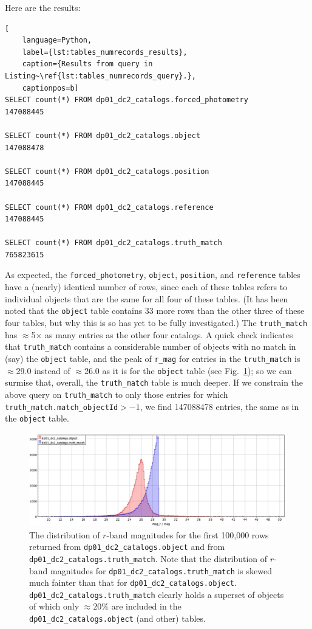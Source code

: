 \documentclass[DM,authoryear,toc]{lsstdoc}
\begin{document}
Here are the results:

\begin{lstlisting}[
    language=Python,
    label={lst:tables_numrecords_results},
    caption={Results from query in Listing~\ref{lst:tables_numrecords_query}.},
    captionpos=b]
SELECT count(*) FROM dp01_dc2_catalogs.forced_photometry
147088445

SELECT count(*) FROM dp01_dc2_catalogs.object
147088478

SELECT count(*) FROM dp01_dc2_catalogs.position
147088445
 
SELECT count(*) FROM dp01_dc2_catalogs.reference
147088445

SELECT count(*) FROM dp01_dc2_catalogs.truth_match
765823615
\end{lstlisting}

As expected, the \texttt{forced\_photometry}, \texttt{object},
\texttt{position}, and \texttt{reference} tables have a (nearly)
identical number of rows, since each of these tables refers to
individual objects that are the same for all four of these tables.
(It has been noted that the \texttt{object} table contains 33 more
rows than the other three of these four tables, but why this is so has
yet to be fully investigated.)  The \texttt{truth\_match} has
$\approx$5$\times$ as many entries as the other four catalogs.  A
quick check indicates that \texttt{truth\_match} contains a
considerable number of objects with no match in (say) the
\texttt{object} table, and the peak of \texttt{r\_mag} for entries in
the \texttt{truth\_match} is $\approx$29.0 instead of $\approx$26.0 as it is
for the \texttt{object} table (see
Fig.~\ref{fig:truth_match_object_mag_r}); so we can surmise that, overall,
the \texttt{truth\_match} table is much deeper.  If we constrain the above
query on \texttt{truth\_match} to only those entries for which
\texttt{truth\_match.match\_objectId}$>-1$, we find 147088478 entries,
the same as in the \texttt{object} table.

\begin{figure}
\includegraphics[width=1.0\textwidth]{Plots/truth_match_object_mag_r.pdf}
\caption{The distribution of $r$-band magnitudes for the first 100,000 rows returned from \texttt{dp01\_dc2\_catalogs.object} and from \texttt{dp01\_dc2\_catalogs.truth\_match}.  Note that the distribution of $r$-band magnitudes for \texttt{dp01\_dc2\_catalogs.truth\_match} is skewed much fainter than that for \texttt{dp01\_dc2\_catalogs.object}.  \texttt{dp01\_dc2\_catalogs.truth\_match}  clearly holds a superset of objects of which only $\approx20\%$ are included in the \texttt{dp01\_dc2\_catalogs.object} (and other) tables.
 }
\label{fig:truth_match_object_mag_r}
\end{figure}
\end{document}
